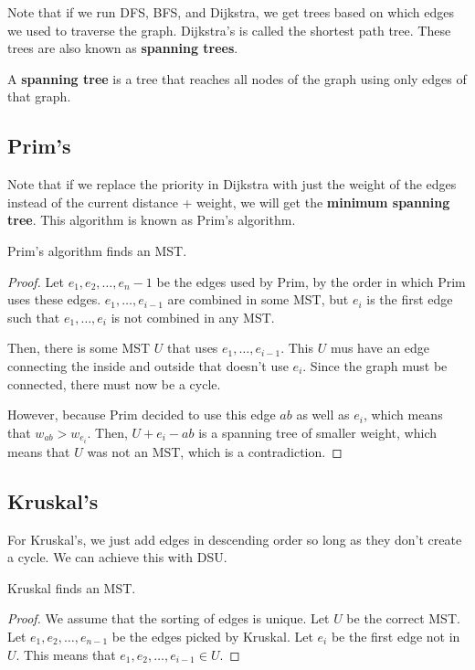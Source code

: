 
Note that if we run DFS, BFS, and Dijkstra, we get trees based on which edges we used to traverse the graph. Dijkstra's is called the shortest path tree. These trees are also known as \textbf{spanning trees}.

\begin{definition}
	A \textbf{spanning tree} is a tree that reaches all nodes of the graph using only edges of that graph.
\end{definition}

\subsection{Prim's}

Note that if we replace the priority in Dijkstra with just the weight of the edges instead of the current distance + weight, we will get the \textbf{minimum spanning tree}. This algorithm is known as Prim's algorithm.

\begin{theorem}
	Prim's algorithm finds an MST.
\end{theorem}
\begin{proof}
	Let \( e_{1}, e_{2}, \ldots, e_n-1  \) be the edges used by Prim, by the order in which Prim uses these edges. \( e_{1}, \ldots , e_{i-1} \) are combined in some MST, but \( e_i \) is the first edge such that \( e_{1}, \ldots , e_i \) is not combined in any MST.

	Then, there is some MST \( U \) that uses \( e_{1}, \ldots , e_{i-1} \). This \( U \) mus have an edge connecting the inside and outside that doesn't use \( e_i \). Since the graph must be connected, there must now be a cycle.

	However, because Prim decided to use this edge \( ab \) as well as \( e_i \), which means that \( w_{ab} > w_{e_i} \). Then, \( U + e_i - ab \) is a spanning tree of smaller weight, which means that \( U \) was not an MST, which is a contradiction.
\end{proof}

\subsection{Kruskal's}

For Kruskal's, we just add edges in descending order so long as they don't create a cycle. We can achieve this with DSU.

\begin{theorem}
	Kruskal finds an MST.
\end{theorem}
\begin{proof}
	We assume that the sorting of edges is unique. Let \( U \) be the correct MST. Let \( e_{1}, e_{2}, \ldots , e_{n-1} \) be the edges picked by Kruskal. Let \( e_i \) be the first edge not in \( U \). This means that \( e_{1}, e_{2}, \ldots , e_{i-1} \in U \).
\end{proof}
